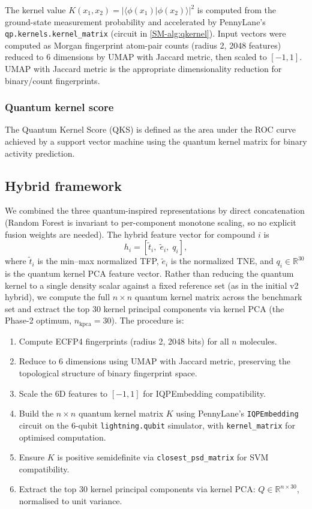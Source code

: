 \documentclass[11pt,a4paper]{article}
\begin{document}
The kernel value $K(x_1, x_2) = |\langle \phi(x_1) | \phi(x_2) \rangle|^2$ is computed from the ground-state measurement probability and accelerated by PennyLane's \texttt{qp.kernels.kernel\_matrix} (circuit in \cref{SM-alg:qkernel}). Input vectors were computed as Morgan fingerprint atom-pair counts (radius 2, \num{2048} features) reduced to 6 dimensions by UMAP with Jaccard metric, then scaled to $[-1, 1]$. UMAP with Jaccard metric is the appropriate dimensionality reduction for binary/count fingerprints.

\subsubsection{Quantum kernel score}

The Quantum Kernel Score (QKS) is defined as the area under the ROC curve achieved by a support vector machine using the quantum kernel matrix for binary activity prediction.

\subsection{Hybrid framework}

We combined the three quantum-inspired representations by direct concatenation (Random Forest is invariant to per-component monotone scaling, so no explicit fusion weights are needed). The hybrid feature vector for compound $i$ is
\begin{equation}
h_i = \left[\tilde{t}_i,\; \tilde{e}_i,\; q_i\right],
\end{equation}
where $\tilde{t}_i$ is the min--max normalized TFP, $\tilde{e}_i$ is the normalized TNE, and $q_i \in \mathbb{R}^{30}$ is the quantum kernel PCA feature vector. Rather than reducing the quantum kernel to a single density scalar against a fixed reference set (as in the initial v2 hybrid), we compute the full $n \times n$ quantum kernel matrix across the benchmark set and extract the top \num{30} kernel principal components via kernel PCA (the Phase-2 optimum, $n_{\text{kpca}}=30$). The procedure is:

\begin{enumerate}
\item Compute ECFP4 fingerprints (radius 2, \num{2048} bits) for all $n$ molecules.
\item Reduce to 6 dimensions using UMAP with Jaccard metric, preserving the topological structure of binary fingerprint space.
\item Scale the 6D features to $[-1, 1]$ for IQPEmbedding compatibility.
\item Build the $n \times n$ quantum kernel matrix $K$ using PennyLane's \texttt{IQPEmbedding} circuit on the 6-qubit \texttt{lightning.qubit} simulator, with \texttt{kernel\_matrix} for optimised computation.
\item Ensure $K$ is positive semidefinite via \texttt{closest\_psd\_matrix} for SVM compatibility.
\item Extract the top \num{30} kernel principal components via kernel PCA: $Q \in \mathbb{R}^{n \times 30}$, normalised to unit variance.
\end{enumerate}
\end{document}
